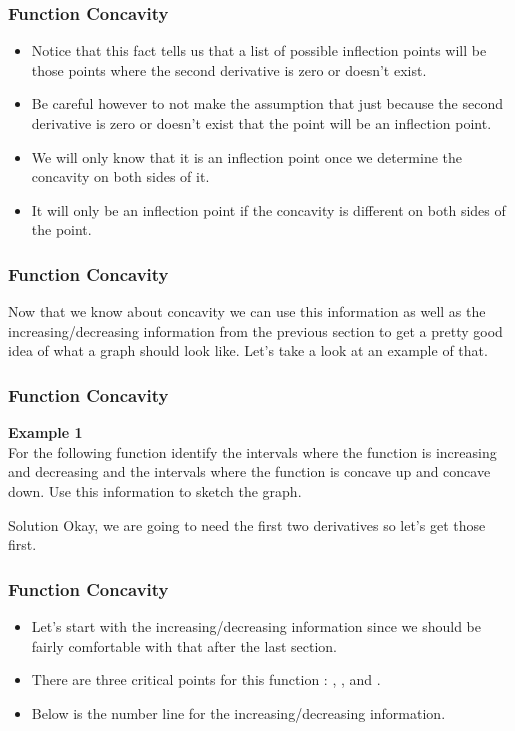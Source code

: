 \documentclass{beamer}
\begin{document}
\begin{frame} 
	\frametitle{Function Concavity}
	\begin{itemize}
	\item  Notice that this fact tells us that a list of possible inflection points will be those points where the second derivative is zero or doesn’t exist.  
	\item Be careful however to not make the assumption that just because the second derivative is zero or doesn’t exist that the point will be an inflection point.  
	\item We will only know that it is an inflection point once we determine the concavity on both sides of it.  
	\item It will only be an inflection point if the concavity is different on both sides of the point.
	\end{itemize}
	
 \end{frame}
 \begin{frame} 
 	\frametitle{Function Concavity}
 Now that we know about concavity we can use this information as well as the increasing/decreasing information from the previous section to get a pretty good idea of what a graph should look like.  Let’s take a look at an example of that.
\end{frame}
\begin{frame} 
	\frametitle{Function Concavity}
	
\textbf{Example 1}\\ For the following function identify the intervals where the function is increasing and decreasing and the intervals where the function is concave up and concave down.  Use this information to sketch the graph.
 
 
 Solution
 Okay, we are going to need the first two derivatives so let’s get those first.
 
\end{frame}
\begin{frame} 
	\frametitle{Function Concavity}
\begin{itemize}
\item Let’s start with the increasing/decreasing information since we should be fairly comfortable with that after the last section.
 
\item There are three critical points for this function : ,  , and .  
\item Below is the number line for the increasing/decreasing information.
\end{itemize}

\end{frame}
\end{document}
